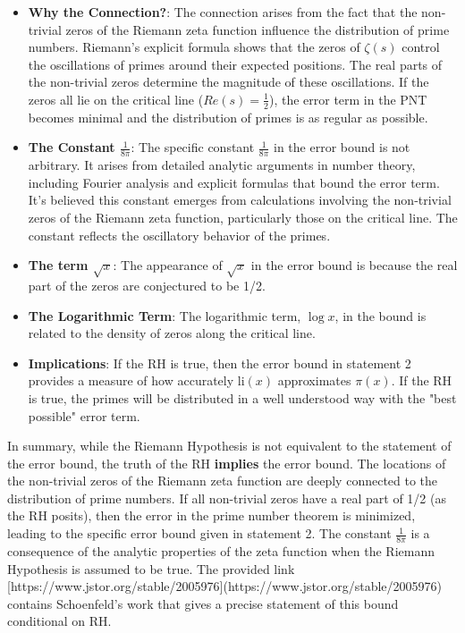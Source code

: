 \documentclass{article}
\begin{document}
\begin{itemize}
     \item  \textbf{Why the Connection?}: The connection arises from the fact that the non-trivial zeros of the Riemann zeta function influence the distribution of prime numbers. Riemann's explicit formula shows that the zeros of \( \zeta(s) \) control the oscillations of primes around their expected positions.  The real parts of the non-trivial zeros determine the magnitude of these oscillations. If the zeros all lie on the critical line (\(Re(s) = \frac{1}{2}\)), the error term in the PNT becomes minimal and the distribution of primes is as regular as possible.
    
    \item \textbf{The Constant \(\frac{1}{8\pi}\)}: The specific constant \( \frac{1}{8\pi} \) in the error bound is not arbitrary. It arises from detailed analytic arguments in number theory, including Fourier analysis and explicit formulas that bound the error term. It's believed this constant emerges from calculations involving the non-trivial zeros of the Riemann zeta function, particularly those on the critical line. The constant reflects the oscillatory behavior of the primes.
   
    \item \textbf{The term \(\sqrt{x}\)}:  The appearance of \( \sqrt{x} \) in the error bound is because the real part of the zeros are conjectured to be 1/2.

   \item \textbf{The Logarithmic Term}: The logarithmic term,  \(\log x\), in the bound is related to the density of zeros along the critical line.

   \item \textbf{Implications}:  If the RH is true, then the error bound in statement 2 provides a measure of how accurately \( \text{li}(x) \) approximates \( \pi(x) \). If the RH is true, the primes will be distributed in a well understood way with the "best possible" error term.
    
\end{itemize}

In summary, while the Riemann Hypothesis is not equivalent to the statement of the error bound, the truth of the RH \textbf{implies} the error bound.  The locations of the non-trivial zeros of the Riemann zeta function are deeply connected to the distribution of prime numbers. If all non-trivial zeros have a real part of 1/2 (as the RH posits), then the error in the prime number theorem is minimized, leading to the specific error bound given in statement 2. The constant \( \frac{1}{8\pi} \) is a consequence of the analytic properties of the zeta function when the Riemann Hypothesis is assumed to be true. The provided link [https://www.jstor.org/stable/2005976](https://www.jstor.org/stable/2005976) contains Schoenfeld's work that gives a precise statement of this bound conditional on RH.
\end{document}
